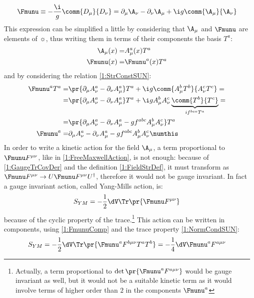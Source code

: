 \begin{equation}
    \Fmunu\equiv -\frac{\i}{g}\comm{D_\mu}{D_\nu} = \partial_\mu\A_\nu -\partial_\nu\A_\mu +\i g\comm{\A_\mu}{\A_\nu} \label{1:FieldStrDef}
\end{equation}
This expression can be simplified a little by considering that $\A_\mu$ and $\Fmunu$ are elements of $\sun$, thus writing them in terms of their components \wrt the basis $T^a$:
\begin{align}
    \A_\mu(x) =& A_\mu^a(x) T^a \label{1:AmuComp}\\
    \Fmunu(x) =& \Fmunu^a(x) T^a \label{1:FmunuComp}
\end{align}
and by considering the relation \eqref{1:StrConstSUN}:
\begin{align*}
    \Fmunu^aT^a =& \pr{\partial_\mu A_\nu^a-\partial_\nu A_\mu^a}T^a +\i g\comm{A_\mu^bT^b}{A_\nu^cT^c}= \\
    =& \pr{\partial_\mu A_\nu^a-\partial_\nu A_\mu^a}T^a +\i gA_\mu^bA_\nu^c\underbrace{\comm{T^b}{T^c}}_{if^{bca}T^a}= \\
    =& \pr{\partial_\mu A_\nu^a-\partial_\nu A_\mu^a -gf^{abc}A_\mu^bA_\nu^c}T^a \\
    \Fmunu^a =& \partial_\mu A_\nu^a-\partial_\nu A_\mu^a -gf^{abc}A_\mu^bA_\nu^c \numthis\label{1:FmunuExplComp}
\end{align*}
In order to write a kinetic action for the field $\A_\mu$, a term proportional to $\Fmunu F^{\mu\nu}$, like in \eqref{1:FreeMaxwellAction}, is not enough:
because of \eqref{1:GaugeTrCovDer} and the definition \eqref{1:FieldStrDef}, it must transform as $\Fmunu F^{\mu\nu}\rightarrow U\Fmunu F^{\mu\nu} U^\dagger$, therefore it would not be gauge invariant.
In fact a gauge invariant action, called Yang-Mills action, is:
\begin{equation}
    S_{YM} = -\frac12\dV\Tr\pr{\Fmunu F^{\mu\nu}} \label{1:YMAction}
\end{equation}
because of the cyclic property of the trace.\footnote{Actually, a term proportional to $\det\pr{\Fmunu^a F^{a\mu\nu}}$ would be gauge invariant as well, but it would not be a suitable kinetic term as it would involve terms of higher order than $2$ in the components $\Fmunu^a$}
This action can be written in components, using \eqref{1:FmunuComp} and the trace property \eqref{1:NormCondSUN}:
\begin{equation}
    S_{YM} = -\frac12\dV\Tr\pr{\Fmunu^a F^{b\mu\nu}T^aT^b} = -\frac14\dV\Fmunu^a F^{a\mu\nu} \label{1:YMActionComp}
\end{equation}
